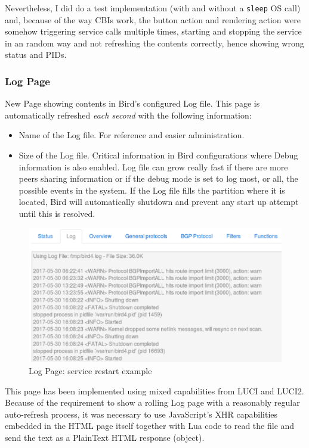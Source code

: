Nevertheless, I did do a test implementation (with and without a \texttt{sleep} OS call) and, because of the way CBIs work, the button action and rendering action were somehow triggering service calls multiple times, starting and stopping the service in an random way and not refreshing the contents correctly, hence showing wrong status and PIDs.

\subsubsection{Log Page}
\label{sub:sub:logp}
New Page showing contents in Bird's configured Log file. This page is automatically refreshed \textit{each second} with the following information:

\begin{itemize}
    \item Name of the Log file. For reference and easier administration.
    \item Size of the Log file. Critical information in Bird configurations where Debug information is also enabled. Log file can grow really fast if there are more peers sharing information or if the debug mode is set to log most, or all, the possible events in the system.
    If the Log file fills the partition where it is located, Bird will automatically shutdown and prevent any start up attempt until this is resolved. 
\end{itemize}

\begin{figure}[H]
    \centering
    \includegraphics[width=\textwidth]{images/bird0.3/log}
    \caption{Log Page: service restart example}
    \label{fig:statusp}
\end{figure}

This page has been implemented using mixed capabilities from LUCI and LUCI2. Because of the requirement to show a rolling Log page with a reasonably regular auto-refresh process, it was necessary to use JavaScript's XHR capabilities embedded in the HTML page itself together with Lua code to read the file and send the text as a PlainText HTML response (object).

